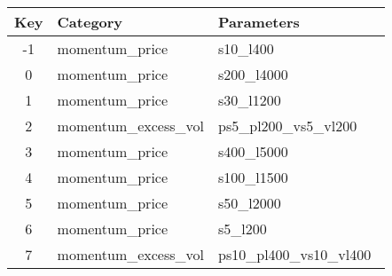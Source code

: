 \begin{tabular}{c|ll}

Key & Category & Parameters \\
\hline
-1 & momentum\_price&s10\_l400\ \\
0 & momentum\_price&s200\_l4000\ \\
1 & momentum\_price&s30\_l1200\ \\
2 & momentum\_excess\_vol&ps5\_pl200\_vs5\_vl200\ \\
3 & momentum\_price&s400\_l5000\ \\
4 & momentum\_price&s100\_l1500\ \\
5 & momentum\_price&s50\_l2000\ \\
6 & momentum\_price&s5\_l200\ \\
7 & momentum\_excess\_vol&ps10\_pl400\_vs10\_vl400\ \\

\end{tabular}